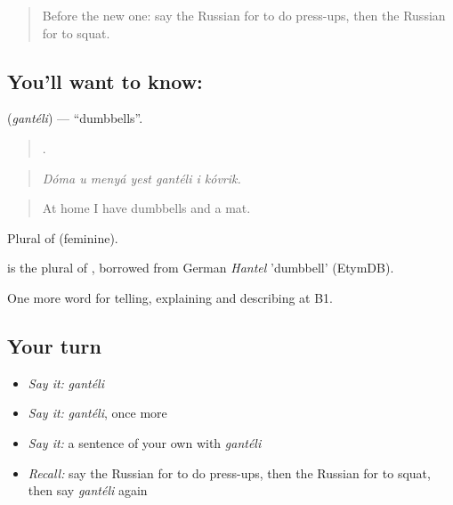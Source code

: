 \label{lesson:RU-C513-ganteli}



\begin{quote}
Before the new one: say the Russian for to do press-ups, then the Russian for to squat.
\end{quote}

\subsection*{You'll want to know: }
\textbf{} (\emph{gantéli}) — \textquotedblleft{}dumbbells\textquotedblright{}.

\begin{quote}
      .
\end{quote}

\begin{quote}
\emph{Dóma u menyá yest gantéli i kóvrik.}
\end{quote}

\begin{quote}
At home I have dumbbells and a mat.
\end{quote}

Plural of \emph{} (feminine).

\begin{cousinweb}
\emph{} is the plural of \emph{}, borrowed from German \emph{Hantel} 'dumbbell' (EtymDB).
\end{cousinweb}

\begin{grammarlens}[title={What you've built}]
One more word for telling, explaining and describing at B1.
\end{grammarlens}

\subsection*{Your turn}
\begin{itemize}
\raggedright
  \item \emph{Say it:} \emph{gantéli}
  \item \emph{Say it:} \emph{gantéli}, once more
  \item \emph{Say it:} a sentence of your own with \emph{gantéli}
  \item \emph{Recall:} say the Russian for to do press-ups, then the Russian for to squat, then say \emph{gantéli} again
\end{itemize}

